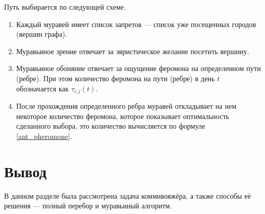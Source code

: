 Путь выбирается по следующей схеме.
\begin{enumerate}[label=\arabic*)]
	\item Каждый муравей имеет список запретов --- список уже посещенных городов (вершин графа).
	\item Муравьиное зрение отвечает за эвристическое желание посетить вершину.
	\item Муравьиное обоняние отвечает за ощущение феромона на определенном пути (ребре). При этом количество феромона на пути (ребре) в день $t$ обозначается как $\tau_{i, j} (t)$.
	\item После прохождения определенного ребра муравей откладывает на нем некоторое количество феромона, которое показывает оптимальность сделанного выбора, это количество вычисляется по формуле \eqref{ant_pheromone}.
\end{enumerate}

\section*{Вывод}
В данном разделе была рассмотрена задача коммивояжёра, а также способы её решения --- полный перебор и муравьиный алгоритм. 